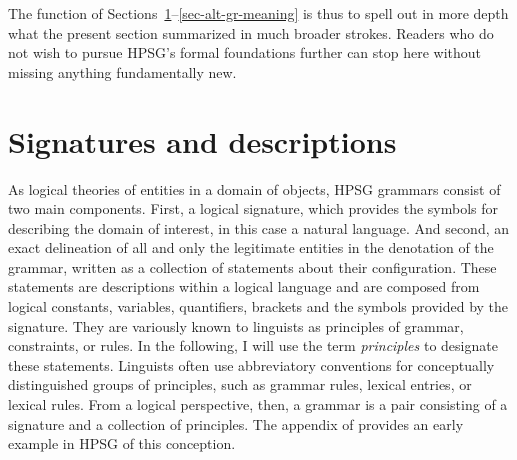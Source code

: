 \documentclass[output=paper
 	        ,biblatex
                ,babelshorthands
                ,newtxmath
                ,draftmode
                ,colorlinks, citecolor=brown
]{langscibook}
\begin{document}
{The function of Sections~\ref{sec-signatures}--\ref{sec-alt-gr-meaning}
is thus to spell out in more depth what the present section summarized
in much broader strokes. Readers who do not wish to pursue HPSG's
formal foundations further
can stop here without missing anything fundamentally new.


\section{Signatures and descriptions}
\label{sec-signatures}

As logical theories of entities in a domain of objects, HPSG grammars
consist of two main components. First, a logical signature, which
provides the symbols for describing the domain of interest, in this
case a natural language. And second, an exact delineation of all and
only the legitimate entities in the denotation of the grammar, written
as a collection of statements about their configuration. These statements are
descriptions within a logical language and are composed from logical
constants, variables, quantifiers, brackets and the symbols provided
by the signature. They are variously known to linguists as principles
of grammar, constraints, or rules. In the following, I will use the
term \emph{principles} to designate these statements.
Linguists often use abbreviatory
conventions for conceptually distinguished groups of principles, such
as grammar rules, lexical entries, or lexical rules. From a logical
perspective,
then, a grammar is a pair consisting of a signature and a collection
of principles.  The appendix of \citet{PollardSag1994} provides an
early example in HPSG of this conception.

}
\end{document}
